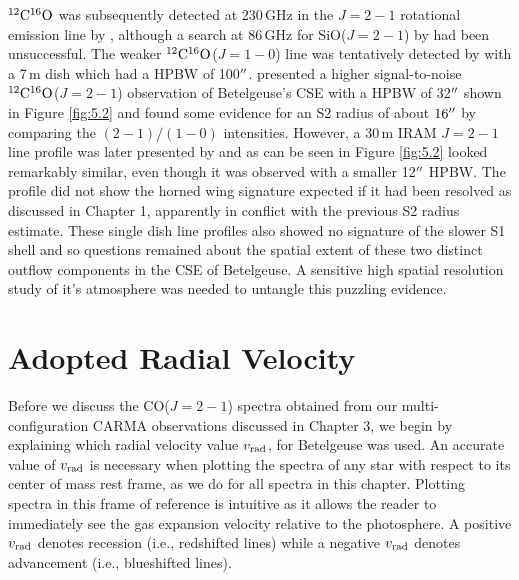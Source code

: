 $\rm{{}^{12}C^{16}O}$ was subsequently detected at 230\,GHz in the $J= 2-1$ rotational emission line by \cite{knapp_1980}, although a search at 86\,GHz for SiO($J= 2-1$) by \cite{lambert_1978} had been unsuccessful. The weaker $\rm{{}^{12}C^{16}O}$($J=1-0$) line was tentatively detected by \cite{knapp_1985} with a 7\,m dish which had a HPBW of 100$^{\prime\prime}$. \cite{huggins_1987} presented a higher signal-to-noise $\rm{{}^{12}C^{16}O}$($J= 2-1$) observation of Betelgeuse's CSE with a HPBW of 32$^{\prime\prime}$ shown in Figure \ref{fig:5.2} and found some evidence for an S2 radius of about $16^{\prime\prime}$ by comparing the  $(2-1)/(1-0)$ intensities. However,  a 30\,m IRAM $J= 2-1$ line profile was later presented by \cite{huggins_1994} and as can be seen in Figure \ref{fig:5.2} looked remarkably similar, even though it was observed with a smaller 12$^{\prime\prime}$ HPBW. The profile did not show the horned wing signature expected if it had been resolved as discussed in Chapter 1, apparently in conflict with the previous S2 radius estimate. These single dish line profiles also showed no signature of the slower S1 shell and so questions remained about the spatial extent of these two distinct outflow components in the CSE of Betelgeuse. A sensitive high spatial resolution study of it's atmosphere was needed to untangle this puzzling evidence.

\section{Adopted Radial Velocity}\label{sec:5.2}

Before we discuss the CO($J=2-1$) spectra obtained from our multi-configuration CARMA observations discussed in Chapter 3, we begin by explaining which radial velocity value $v_{\rm{rad}}$, for Betelgeuse was used. An accurate value of $v_{\rm{rad}}$ is necessary when plotting the spectra of any star with respect to its center of mass rest frame, as we do for all spectra in this chapter. Plotting spectra in this frame of reference is intuitive as it allows the reader to immediately see the gas expansion velocity relative to the photosphere. A positive $v_{\rm{rad}}$ denotes recession (i.e., redshifted lines) while a negative $v_{\rm{rad}}$ denotes advancement (i.e., blueshifted lines).

